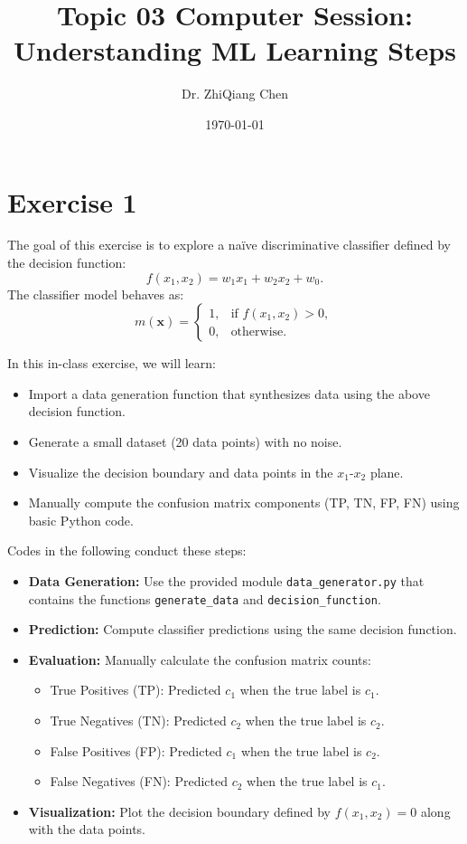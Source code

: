 \documentclass[12pt]{article}
\title{Topic 03 Computer Session: Understanding ML Learning Steps}
\author{Dr. ZhiQiang Chen}
\date{\today}
\begin{document}
\maketitle

\section*{Exercise 1}

The goal of this exercise is to explore a naïve discriminative classifier defined by the decision function:
\[
f(x_1, x_2) = w_1x_1 + w_2x_2 + w_0.
\]
The classifier model behaves as:
\[
m(\mathbf{x}) =
\begin{cases}
1, & \text{if } f(x_1, x_2) > 0, \\
0, & \text{otherwise.}
\end{cases}
\]

In this in-class exercise, we will learn:
\begin{itemize}
    \item Import a data generation function that synthesizes data using the above decision function.
    \item Generate a small dataset (20 data points) with no noise.
    \item Visualize the decision boundary and data points in the \(x_1\)-\(x_2\) plane.
    \item Manually compute the confusion matrix components (TP, TN, FP, FN) using basic Python code.
\end{itemize}

Codes in the following conduct these steps: 
\begin{itemize}
    \item \textbf{Data Generation:} Use the provided module \texttt{data\_generator.py} that contains the functions \texttt{generate\_data} and \texttt{decision\_function}.
    \item \textbf{Prediction:} Compute classifier predictions using the same decision function.
    \item \textbf{Evaluation:} Manually calculate the confusion matrix counts:
    \begin{itemize}
        \item True Positives (TP): Predicted \(c_1\) when the true label is \(c_1\).
        \item True Negatives (TN): Predicted \(c_2\) when the true label is \(c_2\).
        \item False Positives (FP): Predicted \(c_1\) when the true label is \(c_2\).
        \item False Negatives (FN): Predicted \(c_2\) when the true label is \(c_1\).
    \end{itemize}
    \item \textbf{Visualization:} Plot the decision boundary defined by \(f(x_1,x_2)=0\) along with the data points.
\end{itemize}
\end{document}
